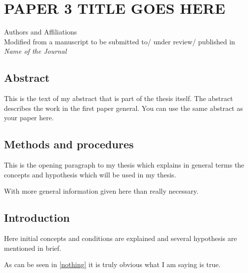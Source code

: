 \chapter{PAPER 3 TITLE GOES HERE}

\begin{center}
    Authors and Affiliations \\
    Modified from a manuscript to be submitted to/ under review/ published in \textit{Name of the Journal}
\end{center}

\section{Abstract}
This is the text of my abstract that is part of the thesis itself.
The abstract describes the work in the first paper general. You can use the same abstract as your paper here.



\section{Methods and procedures}

This is the opening paragraph to my thesis which
explains in general terms the concepts and hypothesis
which will be used in my thesis.

With more general information given here than really
necessary.

\section{Introduction}

Here initial concepts and conditions are explained and
several hypothesis are mentioned in brief.

As can be seen in \autoref{nothing} it is truly
obvious what I am saying is true.


